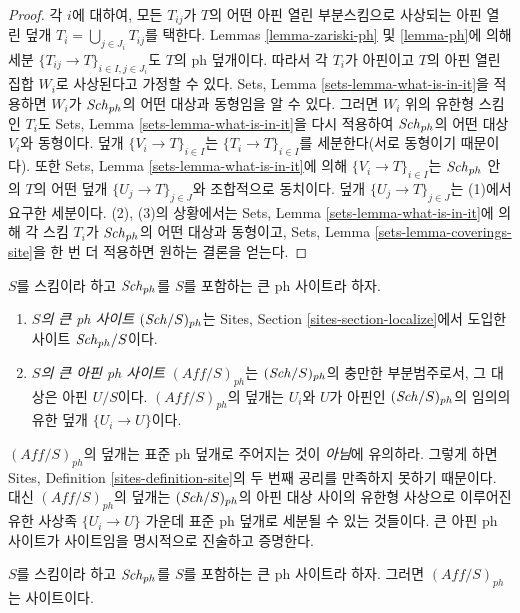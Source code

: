 \begin{proof}
각 $i$에 대하여, 모든 $T_{ij}$가 $T$의 어떤 아핀 열린 부분스킴으로
사상되는 아핀 열린 덮개
$T_i = \bigcup_{j \in J_i} T_{ij}$를 택한다. Lemmas
\ref{lemma-zariski-ph} 및 \ref{lemma-ph}에 의해 세분
$\{T_{ij} \to T\}_{i \in I, j \in J_i}$도 $T$의 ph 덮개이다. 따라서
각 $T_i$가 아핀이고 $T$의 아핀 열린집합 $W_i$로 사상된다고 가정할 수
있다. Sets, Lemma \ref{sets-lemma-what-is-in-it}을 적용하면 $W_i$가
$\mathit{Sch}_{ph}$의 어떤 대상과 동형임을 알 수 있다. 그러면 $W_i$ 위의
유한형 스킴인 $T_i$도 Sets, Lemma \ref{sets-lemma-what-is-in-it}을 다시
적용하여 $\mathit{Sch}_{ph}$의 어떤 대상 $V_i$와 동형이다. 덮개
$\{V_i \to T\}_{i \in I}$는 $\{T_i \to T\}_{i \in I}$를 세분한다(서로
동형이기 때문이다). 또한 Sets, Lemma
\ref{sets-lemma-what-is-in-it}에 의해 $\{V_i \to T\}_{i \in I}$는
$\mathit{Sch}_{ph}$ 안의 $T$의 어떤 덮개 $\{U_j \to T\}_{j \in J}$와 조합적으로
동치이다. 덮개 $\{U_j \to T\}_{j \in J}$는 (1)에서 요구한 세분이다.
(2), (3)의 상황에서는 Sets, Lemma \ref{sets-lemma-what-is-in-it}에 의해
각 스킴 $T_i$가 $\mathit{Sch}_{ph}$의 어떤 대상과 동형이고, Sets, Lemma
\ref{sets-lemma-coverings-site}을 한 번 더 적용하면 원하는 결론을 얻는다.
\end{proof}

\begin{definition}
\label{definition-big-small-ph}
$S$를 스킴이라 하고 $\mathit{Sch}_{ph}$를 $S$를 포함하는 큰 ph 사이트라 하자.
\begin{enumerate}
\item {\it $S$의 큰 ph 사이트} $(\mathit{Sch}/S)_{ph}$는 Sites, Section
\ref{sites-section-localize}에서 도입한 사이트 $\mathit{Sch}_{ph}/S$이다.
\item {\it $S$의 큰 아핀 ph 사이트} $(\textit{Aff}/S)_{ph}$는
$(\mathit{Sch}/S)_{ph}$의 충만한 부분범주로서, 그 대상은 아핀 $U/S$이다.
$(\textit{Aff}/S)_{ph}$의 덮개는 $U_i$와 $U$가 아핀인
$(\mathit{Sch}/S)_{ph}$의 임의의 유한 덮개 $\{U_i \to U\}$이다.
\end{enumerate}
\end{definition}

\noindent
$(\textit{Aff}/S)_{ph}$의 덮개는 표준 ph 덮개로 주어지는 것이
{\it 아님}에 유의하라. 그렇게 하면 Sites, Definition
\ref{sites-definition-site}의 두 번째 공리를 만족하지 못하기 때문이다.
대신 $(\textit{Aff}/S)_{ph}$의 덮개는 $(\mathit{Sch}/S)_{ph}$의 아핀 대상 사이의
유한형 사상으로 이루어진 유한 사상족 $\{U_i \to U\}$ 가운데 표준 ph
덮개로 세분될 수 있는 것들이다. 큰 아핀 ph 사이트가 사이트임을
명시적으로 진술하고 증명한다.

\begin{lemma}
\label{lemma-verify-site-ph}
$S$를 스킴이라 하고 $\mathit{Sch}_{ph}$를 $S$를 포함하는 큰 ph 사이트라 하자.
그러면 $(\textit{Aff}/S)_{ph}$는 사이트이다.
\end{lemma}

